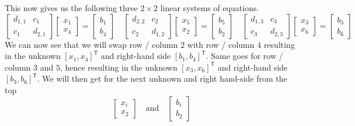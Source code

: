 \documentclass{article}
\begin{document}
This now gives us the following three $2 \times 2$ linear systems of equations.
\begin{equation*}
    \begin{bmatrix}
        d_{1,1} & c_{1} \\
        c_{1} & d_{2,1}
    \end{bmatrix} \begin{bmatrix}
        x_{1} \\ x_{4}
    \end{bmatrix} = \begin{bmatrix}
        b_{1} \\ b_{4}
    \end{bmatrix} \quad \begin{bmatrix}
        d_{2,2} & c_{2} \\
        c_{2} & d_{1,2}
    \end{bmatrix}\begin{bmatrix}
        x_{5} \\ x_{2}
    \end{bmatrix} = \begin{bmatrix}
        b_{5} \\ b_{2}
    \end{bmatrix} \quad \begin{bmatrix}
        d_{1,3} & c_{3} \\
        c_{3} & d_{2,3}
    \end{bmatrix} \begin{bmatrix}
        x_{3} \\
        x_{6}
    \end{bmatrix} = \begin{bmatrix}
        b_{3} \\ b_{6}
    \end{bmatrix}
\end{equation*}
We can now see that we will swap row / column $2$ with row / column $4$ resulting in the unknown $\left[x_{1},x_{4}\right]^{\mathsf{T}}$ and right-hand side $\left[b_{1},b_{4}\right]^{\mathsf{T}}$. Same goes for row / column $3$ and $5$, hence resulting in the unknown $\left[x_{3},x_{6}\right]^{\mathsf{T}}$ and right-hand side $\left[b_{3},b_{6}\right]^{\mathsf{T}}$. We will then get for the next unknown and right hand-side from the top
\begin{equation*}
    \begin{bmatrix}
        x_{i} \\ x_{2}
    \end{bmatrix} \quad \text{and} \quad \begin{bmatrix}
        b_{i} \\ b_{2}
    \end{bmatrix}
\end{equation*}
\end{document}
